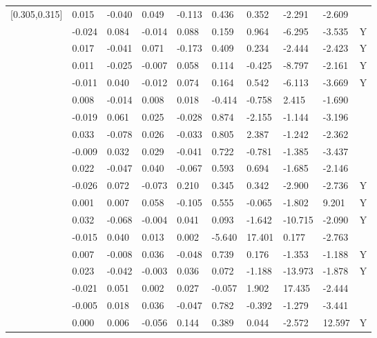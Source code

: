 \begin{table}[ht]
\begin{tabular}{llllllllll}
  [0.305,0.315] &  0.015 & -0.040 &  0.049 & -0.113 &   0.436 &   0.352 &  -2.291 &  -2.609 &  \\ 
  [0.315,0.325] & -0.024 &  0.084 & -0.014 &  0.088 &   0.159 &   0.964 &  -6.295 &  -3.535 & Y \\ 
  [0.325,0.335] &  0.017 & -0.041 &  0.071 & -0.173 &   0.409 &   0.234 &  -2.444 &  -2.423 & Y \\ 
  [0.335,0.345] &  0.011 & -0.025 & -0.007 &  0.058 &   0.114 &  -0.425 &  -8.797 &  -2.161 & Y \\ 
  [0.345,0.355] & -0.011 &  0.040 & -0.012 &  0.074 &   0.164 &   0.542 &  -6.113 &  -3.669 & Y \\ 
  [0.355,0.365] &  0.008 & -0.014 &  0.008 &  0.018 &  -0.414 &  -0.758 &   2.415 &  -1.690 &  \\ 
  [0.365,0.375] & -0.019 &  0.061 &  0.025 & -0.028 &   0.874 &  -2.155 &  -1.144 &  -3.196 &  \\ 
  [0.375,0.385] &  0.033 & -0.078 &  0.026 & -0.033 &   0.805 &   2.387 &  -1.242 &  -2.362 &  \\ 
  [0.385,0.395] & -0.009 &  0.032 &  0.029 & -0.041 &   0.722 &  -0.781 &  -1.385 &  -3.437 &  \\ 
  [0.395,0.405] &  0.022 & -0.047 &  0.040 & -0.067 &   0.593 &   0.694 &  -1.685 &  -2.146 &  \\ 
  [0.405,0.415] & -0.026 &  0.072 & -0.073 &  0.210 &   0.345 &   0.342 &  -2.900 &  -2.736 & Y \\ 
  [0.415,0.425] &  0.001 &  0.007 &  0.058 & -0.105 &   0.555 &  -0.065 &  -1.802 &   9.201 & Y \\ 
  [0.425,0.435] &  0.032 & -0.068 & -0.004 &  0.041 &   0.093 &  -1.642 & -10.715 &  -2.090 & Y \\ 
  [0.435,0.445] & -0.015 &  0.040 &  0.013 &  0.002 &  -5.640 &  17.401 &   0.177 &  -2.763 &  \\ 
  [0.445,0.455] &  0.007 & -0.008 &  0.036 & -0.048 &   0.739 &   0.176 &  -1.353 &  -1.188 & Y \\ 
  [0.455,0.465] &  0.023 & -0.042 & -0.003 &  0.036 &   0.072 &  -1.188 & -13.973 &  -1.878 & Y \\ 
  [0.465,0.475] & -0.021 &  0.051 &  0.002 &  0.027 &  -0.057 &   1.902 &  17.435 &  -2.444 &  \\ 
  [0.475,0.485] & -0.005 &  0.018 &  0.036 & -0.047 &   0.782 &  -0.392 &  -1.279 &  -3.441 &  \\ 
  [0.485,0.495] &  0.000 &  0.006 & -0.056 &  0.144 &   0.389 &   0.044 &  -2.572 &  12.597 & Y \\ 

\end{tabular}
\end{table}
